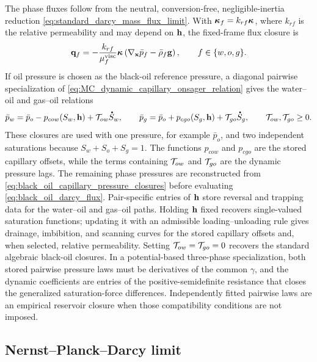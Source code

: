 The phase fluxes follow from the neutral, conversion-free,
negligible-inertia reduction \eqref{eq:standard_darcy_mass_flux_limit}.  With
\(\boldsymbol{\kappa}_f=k_{rf}\boldsymbol{\kappa}\), where $k_{rf}$ is the relative permeability
and may depend on \(\mathbf{h}\),
the fixed-frame flux closure is
%
\begin{equation}
	\mathbf{q}_f
	=
	-\frac{k_{rf}}{\mu_f^{\mathrm{visc}}}\boldsymbol{\kappa}
	\left(\nabla_{\mathbf{x}}\bar p_f-\bar\rho_f\mathbf{g}\right),
	\qquad
	f\in\{w,o,g\}.
	\label{eq:black_oil_darcy_flux}
\end{equation}
%
If oil pressure is chosen as the black-oil reference pressure, a diagonal
pairwise specialization of
\eqref{eq:MC_dynamic_capillary_onsager_relation} gives the water--oil and
gas--oil relations
%
\begin{equation}
	\bar p_w
	=
	\bar p_o-p_{cow}(S_w,\mbf h)+\mc T_{ow}\phasedot S_w,
	\qquad
	\bar p_g
	=
	\bar p_o+p_{cgo}(S_g,\mbf h)+\mc T_{go}\phasedot S_g,
	\qquad
	\mc T_{ow},\mc T_{go}\ge0 .
	\label{eq:black_oil_capillary_pressure_closures}
\end{equation}
%
These closures are used with one pressure, for example \(\bar p_o\), and two
independent saturations because \(S_w+S_o+S_g=1\).  The functions \(p_{cow}\)
and \(p_{cgo}\) are the stored capillary offsets, while the terms containing
\(\mathcal{T}_{ow}\) and \(\mathcal{T}_{go}\) are the dynamic pressure lags.  The remaining
phase pressures are reconstructed from
\eqref{eq:black_oil_capillary_pressure_closures} before evaluating
\eqref{eq:black_oil_darcy_flux}.  Pair-specific entries of \(\mathbf{h}\) store
reversal and trapping data for the water--oil and gas--oil paths.  Holding
\(\mathbf{h}\) fixed recovers single-valued saturation functions; updating it with
an admissible loading--unloading rule gives drainage, imbibition, and scanning
curves for the stored capillary offsets and, when selected, relative
permeability.  Setting \(\mathcal{T}_{ow}=\mathcal{T}_{go}=0\) recovers the standard
algebraic black-oil closures.  In a potential-based three-phase specialization,
both stored pairwise pressure laws must be derivatives of the common \(\gamma\),
and the dynamic coefficients are entries of the positive-semidefinite
resistance that closes the generalized saturation-force differences.
Independently fitted pairwise laws are an empirical
reservoir closure when those compatibility conditions are not imposed.

\subsection{Nernst--Planck--Darcy limit}
\label{sec:nernst_planck_darcy_limit}

